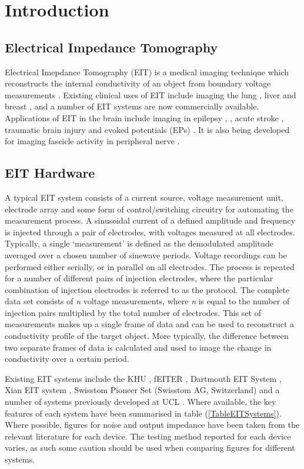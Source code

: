 \section{Introduction}

\subsection{Electrical Impedance Tomography}
Electrical Imepdance Tomography (EIT) is a medical imaging technique which reconstructs the internal conductivity of an object from boundary voltage measurements \cite{Metherall1996}. Existing clinical uses of EIT include imaging the lung \cite{Frerichs_2000}, liver \cite{YOU_2009} and breast \cite{Halter}, and a number of EIT systems are now commercially available. Applications of EIT in the brain include imaging in epilepsy \cite{Vongerichten_2016}, \cite{Fabrizi_2006}, acute stroke \cite{Dowrick_2016}, traumatic brain injury \cite{Manwaring2013} and evoked potentials (EPs) \cite{Aristovich_2016}. It is also being developed for imaging fascicle activity in peripheral nerve \cite{KirillStockholm}. 

\subsection{EIT Hardware}

A typical EIT system consists of a current source, voltage measurement unit, electrode array and some form of control/switching circuitry for automating the measurement process. A sinusoidal current of a defined amplitude and frequency is injected through a pair of electrodes, with voltages measured at all electrodes. Typically, a single `measurement' is defined as the demodulated amplitude averaged over a chosen number of sinewave periods. Voltage recordings can be performed either serially, or in parallel on all electrodes. The process is repeated for a number of different pairs of injection electrodes, where the particular combination of injection electrodes is referred to as the protocol. The complete data set consists of \emph{n} voltage measurements, where \emph{n} is equal to the number of injection pairs multiplied by the total number of electrodes. This set of measurements makes up a single frame of data and can be used to reconstruct a conductivity profile of the target object. More typically, the difference between two separate frames of data is calculated and used to image the change in conductivity over a certain period.

Existing EIT systems include the KHU \cite{Hun_Wi_2014}, fEITER \cite{McCann_2011}, Dartmouth EIT System \cite{khan}, Xian EIT system \cite{Shi_Xuetao_2005}, Swisstom Pioneer Set (Swisstom AG, Switzerland) and a number of systems previously developed at UCL \cite{Oh2011} \cite{McEwan_2006}. Where available, the key features of each system have been summarised in table (\ref{TableEITSystems}). Where possible, 
figures for noise and output impedance have been taken from the relevant literature for each device. The testing method reported for each device varies, as such some caution should be used when comparing figures for different systems.
